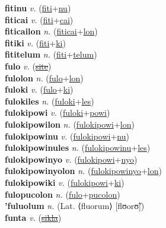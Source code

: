 \textbf{fitinu} \textit{v.} (\hyperref[fiti]{fiti}+\hyperref[nu]{nu})
 \label{fitinu} \\
\textbf{fiticai} \textit{v.} (\hyperref[fiti]{fiti}+\hyperref[cai]{cai})
 \label{fiticai} \\
\textbf{fiticailon} \textit{n.} (\hyperref[fiticai]{fiticai}+\hyperref[lon]{lon})
 \label{fiticailon} \\
\textbf{fitiki} \textit{v.} (\hyperref[fiti]{fiti}+\hyperref[ki]{ki})
 \label{fitiki} \\
\textbf{fititelum} \textit{n.} (\hyperref[fiti]{fiti}+\hyperref[telum]{telum})
 \label{fititelum} \\
\textbf{fulo} \textit{v.} (\hyperref[site]{\sout{site}})
 \label{fulo} \\
\textbf{fulolon} \textit{n.} (\hyperref[fulo]{fulo}+\hyperref[lon]{lon})
 \label{fulolon} \\
\textbf{fuloki} \textit{v.} (\hyperref[fulo]{fulo}+\hyperref[ki]{ki})
 \label{fuloki} \\
\textbf{fulokiles} \textit{n.} (\hyperref[fuloki]{fuloki}+\hyperref[les]{les})
 \label{fulokiles} \\
\textbf{fulokipowi} \textit{v.} (\hyperref[fuloki]{fuloki}+\hyperref[powi]{powi})
 \label{fulokipowi} \\
\textbf{fulokipowilon} \textit{n.} (\hyperref[fulokipowi]{fulokipowi}+\hyperref[lon]{lon})
 \label{fulokipowilon} \\
\textbf{fulokipowinu} \textit{v.} (\hyperref[fulokipowi]{fulokipowi}+\hyperref[nu]{nu})
 \label{fulokipowinu} \\
\textbf{fulokipowinules} \textit{n.} (\hyperref[fulokipowinu]{fulokipowinu}+\hyperref[les]{les})
 \label{fulokipowinules} \\
\textbf{fulokipowinyo} \textit{v.} (\hyperref[fulokipowi]{fulokipowi}+\hyperref[nyo]{nyo})
 \label{fulokipowinyo} \\
\textbf{fulokipowinyolon} \textit{n.} (\hyperref[fulokipowinyo]{fulokipowinyo}+\hyperref[lon]{lon})
 \label{fulokipowinyolon} \\
\textbf{fulokipowiki} \textit{v.} (\hyperref[fulokipowi]{fulokipowi}+\hyperref[ki]{ki})
 \label{fulokipowiki} \\
\textbf{fulopucolon} \textit{n.} (\hyperref[fulo]{fulo}+\hyperref[pucolon]{pucolon})
 \label{fulopucolon} \\
\textbf{'fuluolum} \textit{n.} (Lat. ⟨fluorum⟩ [flʊorʊ̃])
 \label{'fuluolum} \\
\textbf{funta} \textit{v.} (\hyperref[sikla]{\sout{sikla}})
